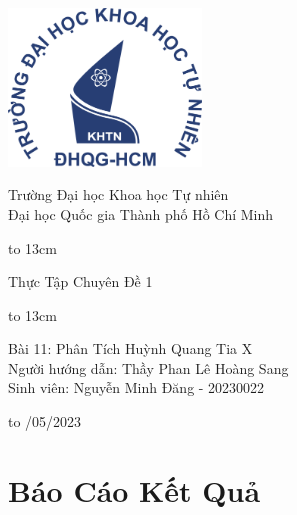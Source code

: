 \documentclass{article}
\begin{document}
\onehalfspacing
{
   \setlength{\topmargin}{-0.5cm}
\begin{titlepage}
  \begin{center}
    \centerline{\includegraphics[height=42mm]{logo}}

    
   \vspace{1cm}

        {\large Trường Đại học Khoa học Tự nhiên}\\[1em]
        {\large Đại học Quốc gia Thành phố Hồ Chí Minh}
    
        \vspace{1.2cm}
    \centerline{\hbox to 13cm{\hrulefill}}
    \vspace{0.3cm}
    \Large  {{Thực Tập Chuyên Đề 1 }}
    \centerline{\hbox to 13cm{\hrulefill}}
    
    \vspace{1.2cm}
    \Large {Bài 11: Phân Tích Huỳnh Quang Tia X}\\ 
   
   \vspace{3cm}
            \large Người hướng dẫn: Thầy Phan Lê Hoàng Sang \\ 
            \large Sinh viên: Nguyễn Minh Đăng - 20230022
    
    \vspace{4cm}
    

    
    \hbox to \textwidth{\hrulefill}
    \vspace{0.2cm}
    {/05/2023}
    
  \end{center}
\end{titlepage}
}

\newpage
\clearpage\thispagestyle{empty}\addtocounter{page}{-1} 
\clearpage
\mbox{}
\newpage
%
\setcounter{section}{1}
\section*{\centering Báo Cáo Kết Quả}
\vspace{1cm}
\end{document}
